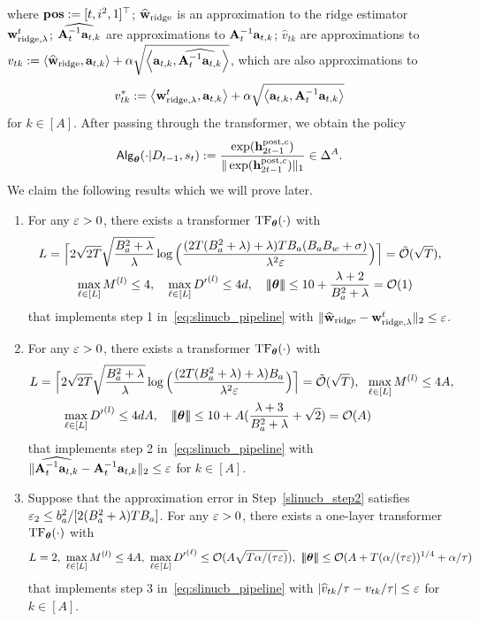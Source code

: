 where ${\mathbf{pos}}:=[t,i^2,1]^\top$; $\widehat{{\mathbf w}}_{{\rm ridge}}$ is an approximation to the ridge estimator ${\mathbf w}^t_{{\rm ridge},\lambda}$; $\widehat{{\mathbf A}_{t}^{-1}{\mathbf a}_{t,k}}$ are approximations to ${{\mathbf A}_{t}^{-1}{\mathbf a}_{t,k}}$;  $\hat v_{tk}$ are approximations to $v_{tk}:=\left\langle\widehat{{\mathbf w}}_{{\rm ridge}},{\mathbf a}_{t,k}\right\rangle+\alpha\sqrt{\left\langle{\mathbf a}_{t,k}, \widehat{{\mathbf A}_t^{-1} {\mathbf a}_{t,k}}\right\rangle}$, which are also approximations to $$
v^*_{tk}:=\left\langle{\mathbf w}^t_{{\rm ridge},\lambda},{\mathbf a}_{t,k}\right\rangle+\alpha\sqrt{\left\langle{\mathbf a}_{t,k}, {{\mathbf A}_t^{-1} {\mathbf a}_{t,k}}\right\rangle}
$$ for $k\in[A]$. After passing through the transformer, we obtain the policy
$$
{\mathsf{Alg}}_{{{\boldsymbol \theta}}}(\cdot|{D}_{t-1},{s}_t):=\frac{\exp({\mathbf h}^{{\mathrm{post}},{c}}_{2t-1})}{\|\exp({\mathbf h}^{{\mathrm{post}},{c}}_{2t-1})\|_1}\in\Delta^A.$$
We claim the following results which we will prove later.
\begin{enumerate}[label=Step \arabic*,ref= \arabic*]
    \item \label{slinucb_step1} For any $\varepsilon>0$,
    there exists a transformer ${\rm TF}_{\boldsymbol \theta}(\cdot)$ with
\begin{align*}
&L=\Big\lceil2\sqrt{2T}\sqrt{\frac{B_a^2+\lambda}{\lambda}}\log\Big(\frac{(2T(B_a^2+\lambda)+\lambda)TB_a(B_aB_w+\sigma)}{\lambda^2\varepsilon}\Big)\Big\rceil={\tilde{\mathcal O}}(\sqrt{T}),\\
&~~~\qquad\max_{\ell\in[L]}M^{(l)}\leq4,~~~\max_{\ell\in[L]}{D'}^{(l)}\leq4d,~~~ {\left|\!\left|\!\left|{{\boldsymbol \theta}}\right|\!\right|\!\right|}\leq  10+\frac{\lambda+2}{B_a^2+\lambda}=\mathcal{O}(1) \end{align*}
 that implements step 1 in~\eqref{eq:slinucb_pipeline} with  $\|\widehat{{\mathbf w}}_{{\rm ridge}}-{\mathbf w}^t_{{\rm ridge},\lambda}\|_2\leq\varepsilon$.
   \item\label{slinucb_step2}
   For any $\varepsilon>0$, there exists a transformer ${\rm TF}_{\boldsymbol \theta}(\cdot)$ with
\begin{align*}
&L=\Big\lceil2\sqrt{2T}\sqrt{\frac{B_a^2+\lambda}{\lambda}}\log\Big(\frac{(2T(B_a^2+\lambda)+\lambda)B_a}{\lambda^2\varepsilon}\Big)\Big\rceil={\tilde{\mathcal O}}(\sqrt{T}),~~\max_{\ell\in[L]}M^{(l)}\leq4A,\\
&\qquad~~
\max_{\ell\in[L]}{D'}^{(l)}\leq4dA,~~~ {\left|\!\left|\!\left|{{\boldsymbol \theta}}\right|\!\right|\!\right|}\leq  10+A(\frac{\lambda+3}{B_a^2+\lambda}+\sqrt{2})=\mathcal{O}(A) \end{align*}
 that implements step 2 in~\eqref{eq:slinucb_pipeline} with  $\|\widehat{{\mathbf A}_{t}^{-1}{\mathbf a}_{t,k}}-{\mathbf A}_{t}^{-1}{\mathbf a}_{t,k}\|_2\leq\varepsilon$ for $k\in[A]$.
  \item\label{slinucb_step3} Suppose that the approximation error in Step~\ref{slinucb_step2} satisfies $\varepsilon_2\leq b_a^2/[2(B_a^2+\lambda)TB_a]$.
  For any $\varepsilon>0$,
  there exists a one-layer transformer ${\rm TF}_{\boldsymbol \theta}(\cdot)$ with
    $$
    L=2,~\max_{\ell\in[L]}M^{(l)}\leq 4A,~ \max_{\ell\in[L]}{D'}^{(\ell)}\leq \mathcal{O}(A\sqrt{T\alpha/({\tau}\varepsilon)}),~{\left|\!\left|\!\left|{{\boldsymbol \theta}}\right|\!\right|\!\right|}\leq  \mathcal{O}(A+T({\alpha/({\tau}\varepsilon)})^{1/4}+\alpha/{\tau}) $$
 that implements step 3 in~\eqref{eq:slinucb_pipeline} with  $|\widehat v_{tk}/{\tau}-v_{tk}/{\tau}|\leq\varepsilon$ for $k\in[A]$.
\end{enumerate}
